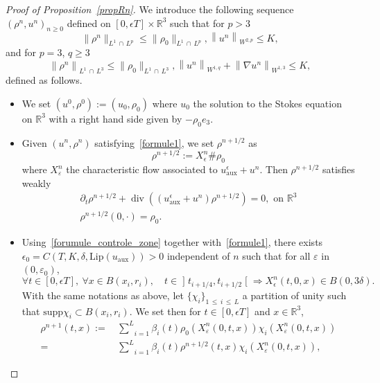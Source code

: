 \documentclass[AHL,Unicode,longabstracts,published]{cedram}
\newcommand{\Lip}{\mathrm{Lip}}
\newcommand{\supp}{\mathrm{supp} }
\newcommand{\aux}{\mathrm{aux}}
\newcommand{\R}{\mathbb{R}}
\renewcommand{\leq}{\leqslant}
\renewcommand{\geq}{\geqslant}
\renewcommand{\div}{\operatorname{div}}
\newcommand{\eps}{\epsilon}
\let\oldforall\forall
\renewcommand*{\forall}{\mathrel{\oldforall}}
\begin{document}
\begin{proof}[Proof of Proposition~\ref{propRn}]
We introduce the following sequence $(\rho^n,u^n)_{n \geq 0}$ defined on $[0,\eps T]\times \R^3$ such that for $p>3$
\begin{equation}\label{formule1}
\|\rho^n\|_{L^1\,\cap\,L^p} \leq \|\rho_0\|_{L^1\,\cap \,L^p}, \left\|u^n\right\|_{W^{2,p}} \leq K,
\end{equation}
and for $p=3$, $q\geq 3$
\begin{equation}\label{formule1_bis}
\left\|\rho^n\right\|_{L^1\,\cap\,L^3} \leq \|\rho_0\|_{L^1\,\cap\,L^3}, \left\|u^n\right\|_{W^{1,q}}+\left\|\nabla u^n\right\|_{W^{1,3}} \leq K,
\end{equation}
defined as follows.
\begin{itemize}
\item We set $(u^0,\rho^0):=(u_0,\rho_0)$ where $u_0$ the solution to the Stokes equation on $\R^3$ with a right hand side given by $-\rho_0e_3$.
\item Given $(u^n,\rho^n)$ satisfying~\eqref{formule1}, we set $\rho^{n+1/2}$ as
\[
\rho^{n+1/2}:=X_\epsilon^n \# \rho_0
\]
where $X^n_\varepsilon$ the characteristic flow associated to $u^\eps_\aux+u^n $. Then $\rho^{n+1/2}$ satisfies weakly
\begin{align*}
\partial_t \rho^{n+1/2}+ \div \left((u^\eps_\aux+u^n)\rho^{n+1/2}\right)=0, {\text{ on } \R^3 }\\
\rho^{n+1/2}(0,\cdot)=\rho_0.
\end{align*}
\item Using~\eqref{forumule_controle_zone} together with~\eqref{formule1}, there exists $\epsilon_0=C(T,K,\delta, \Lip(u_\aux))>0$ independent of $n$ such that for all $\varepsilon$ in $(0, \varepsilon_0)$,
\begin{equation}\label{formule2}
\forall t \in [0,\eps T],\: \forall x\in B(x_i,r_i), \quad t \in\mathopen]t_{i+1/4},t_{i+1/2}\mathclose[\Rightarrow X^n_\eps(t,0,x)\in B(0,3 \delta).
\end{equation}
With the same notations as above, let $\{ \chi_i \}_{1 \,\leq\,i\,\leq\,L}$ a partition of unity such that $\supp \chi_i \subset B(x_i, r_i)$. We set then for $t\in[0,\eps T]$ and $x\in \R^3$,
\begin{align*}
\rho^{n+1}(t,x){:=}& \,\underset{i=1}{\overset{L}{\sum}}\beta_i(t) \rho_0(X^n_\varepsilon(0,t,x)) \chi_i(X^n_\varepsilon(0,t,x))\\
=&\,\underset{i=1}{\overset{L}{\sum}}\beta_i(t) \rho^{n+1/2}(t,x) \chi_i(X^n_\varepsilon(0,t,x)),

\end{align*}
\end{itemize}
\end{proof}
\end{document}
